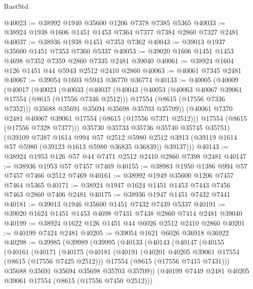 \begin{lexlean}{RustStd}
\begin{coremodule}
@40023 := @38992 @1940 @35600 @1206 @7378 @7385 @5365
@40033 := @38924 @1938 @1606 @1451 @1453 @7364 @7377 @7384 @2860 @7327 @2481
@40037 := @38936 @1938 @1451 @7353 @7362
@40043 := @39013 @1937 @35600 @1451 @7353 @7360 @5337
@40053 := @39020 @1606 @1451 @1453 @4698 @7352 @7359 @2860 @7335 @2481 @39040
@40061 := @38924 @1604 @126 @1451 @44 @5943 @2512 @2410 @2860
@40063 := @40061 @7345 @2481
@40067 := @39054 @1603 @5943 @36770 @36774
@40133 := @40005
    (@40009
      (@40017
        (@40023
          (@40033
            (@40037
              (@40043
                (@40053
                  (@40063 @40067 @39061 @17554 (@8615 (@17556 @7346 @2512)))
                  @17554
                  (@8615 (@17556 @7336 @7352)))
                @35688
                @35691
                @35694
                @35698
                @35703
                @35709))
            (@40061 @7370 @2481 @40067 @39061 @17554 (@8615 (@17556 @7371 @2512)))
            @17554
            (@8615 (@17556 @7328 @7377)))
          @35730
          @35733
          @35736
          @35740
          @35745
          @35751)
        (@39109
          @7387
          @1614
          @994
          @57
          @2512
          @5980
          @2512
          @3913
          (@39119 @1614 @57 @5980 (@39123 @1613 @5980 @36835 @36839))
          @39137)))
@40143 := @38924 @1953 @126 @57 @44 @7471 @2512 @2410 @2860 @7398 @2481
@40147 := @38936 @1953 @57 @7457 @7469
@40155 := @38983 @1950 @1386 @994 @57 @7457 @7466 @2512 @7469
@40161 := @38992 @1949 @35600 @1206 @7457 @7464 @5365
@40171 := @38924 @1947 @1624 @1451 @1453 @7443 @7456 @7463 @2860 @7406 @2481
@40175 := @38936 @1947 @1451 @7432 @7441
@40181 := @39013 @1946 @35600 @1451 @7432 @7439 @5337
@40191 := @39020 @1624 @1451 @1453 @4698 @7431 @7438 @2860 @7414 @2481 @39040
@40199 := @38924 @1622 @126 @1451 @44 @6026 @2512 @2410 @2860
@40201 := @40199 @7424 @2481
@40205 := @39054 @1621 @6026 @36918 @36922
@40298 := @39985
    (@39989
      (@39995
        (@40133
          (@40143
            (@40147
              (@40155
                (@40161
                  (@40171
                    (@40175
                      (@40181
                        (@40191
                          (@40201 @40205 @39061 @17554 (@8615 (@17556 @7425 @2512)))
                          @17554
                          (@8615 (@17556 @7415 @7431)))
                        @35688
                        @35691
                        @35694
                        @35698
                        @35703
                        @35709))
                    (@40199 @7449 @2481 @40205 @39061 @17554 (@8615 (@17556 @7450 @2512)))

\end{coremodule}
\end{lexlean}
